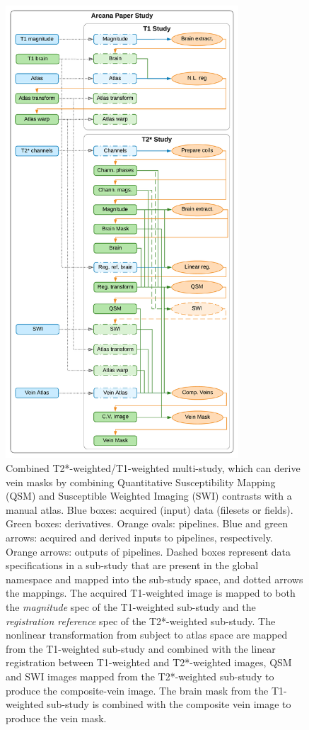 \begin{figure}
  \begin{center}
    \includegraphics[width=0.775\textwidth]{figures/t2star_t1_study}
  \caption{Combined T2*-weighted/T1-weighted multi-study,
which can derive vein masks by combining Quantitative Susceptibility
Mapping (QSM) and Susceptible Weighted Imaging (SWI) contrasts with a
manual atlas. Blue boxes: acquired (input) data (filesets or fields).
Green boxes: derivatives. Orange ovals: pipelines. Blue and green
arrows: acquired and derived inputs to pipelines, respectively. Orange
arrows: outputs of pipelines. Dashed boxes represent data specifications
in a sub-study that are present in the global namespace and mapped into
the sub-study space, and dotted arrows the mappings. The acquired
T1-weighted image is mapped to both the \emph{magnitude} spec of the
T1-weighted sub-study and the \emph{registration reference} spec of the
T2*-weighted sub-study. The nonlinear transformation from subject to
atlas space are mapped from the T1-weighted sub-study and combined with
the linear registration between T1-weighted and T2*-weighted images, QSM
and SWI images mapped from the T2*-weighted sub-study to produce the
composite-vein image. The brain mask from the T1-weighted sub-study is
combined with the composite vein image to produce the vein mask.}
  \end{center}
\label{fig:t2star_t1_study}
\end{figure} 

